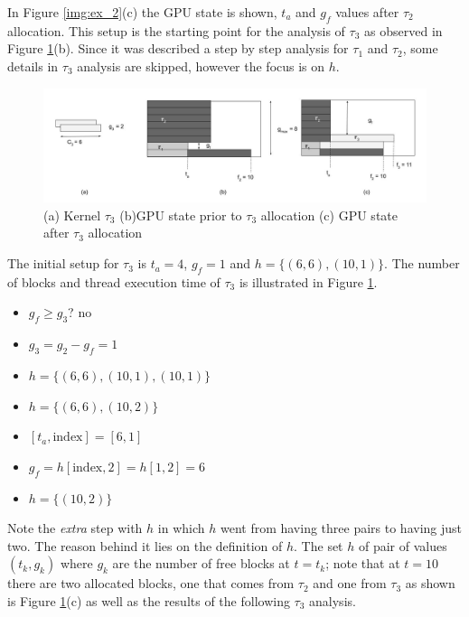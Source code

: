 \documentclass[
  12pt,
  a4paperpaper,
]{report}
\providecommand{\tightlist}{%
  \setlength{\itemsep}{0pt}\setlength{\parskip}{0pt}}
\begin{document}
In Figure \ref{img:ex_2}(c) the GPU state is shown, \(t_a\) and \(g_f\)
values after \(\tau_2\) allocation. This setup is the starting point for
the analysis of \(\tau_3\) as observed in Figure \ref{img:ex_3}(b).
Since it was described a step by step analysis for \(\tau_1\) and
\(\tau_2\), some details in \(\tau_3\) analysis are skipped, however the focus is on \(h\).

\begin{figure}
\centering
\includegraphics{source/figures/ex_3.jpg}
\caption{(a) Kernel \(\tau_3\) (b)GPU state prior to \(\tau_3\)
allocation (c) GPU state after \(\tau_3\) allocation \label{img:ex_3}}
\end{figure}

The initial setup for \(\tau_3\) is \(t_a = 4\), \(g_f= 1\) and
\(h = \{ (6,6),(10,1) \}\). The number of blocks and thread execution
time of \(\tau_3\) is illustrated in Figure \ref{img:ex_3}.

\begin{itemize}
\tightlist
\item
  \(g_f \geq g_3\)? no
\item
  \(g_3 = g_2 - g_f = 1\)
\item
  \(h = \{ (6,6), (10,1), (10,1) \}\)
\item
  \(h = \{ (6,6), (10,2) \}\)
\item
  \([ t_a, \mathrm{index} ] = [6,1]\)
\item
  \(g_f = h[ \mathrm{index},2] = h[1,2] = 6\)
\item
  \(h = \{(10,2)\}\)
\end{itemize}

Note the \emph{extra} step with \(h\) in which
\(h\) went from having three pairs to having just two. The reason behind
it lies on the definition of \(h\). The set \(h\) of pair of values
\((t_k, g_k)\) where \(g_k\) are the number of free blocks at \(t=t_k\);
note that at \(t=10\) there are two allocated blocks, one
that comes from \(\tau_2\) and one from \(\tau_3\) as shown is Figure
\ref{img:ex_3}(c) as well as the results of the following \(\tau_3\)
analysis.
\end{document}
